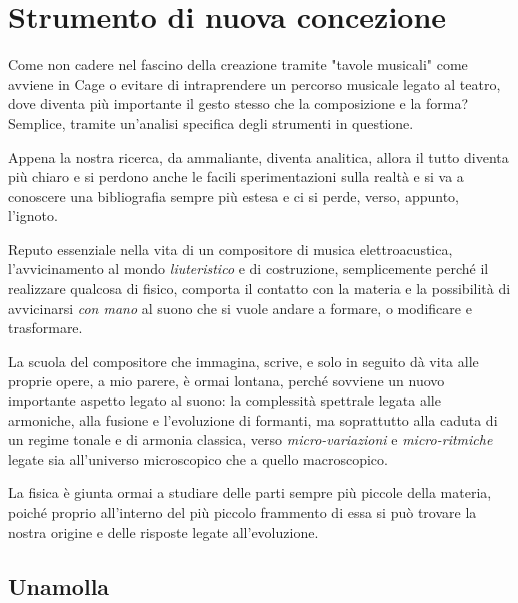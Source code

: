 
\chapter{Strumento di nuova concezione}
\label{Strumento di nuova concezione}

Come non cadere nel fascino della creazione tramite "tavole musicali" come avviene
in Cage o evitare di intraprendere un percorso musicale legato al teatro, dove
diventa più importante il gesto stesso che la composizione e la forma? Semplice,
tramite un'analisi specifica degli strumenti in questione.

Appena la nostra ricerca, da ammaliante, diventa analitica, allora il tutto
diventa più chiaro e si perdono anche le facili sperimentazioni sulla realtà e
si va a conoscere una bibliografia sempre più estesa e ci si perde, verso, appunto,
l'ignoto.

Reputo essenziale nella vita di un compositore di musica elettroacustica,
l'avvicinamento al mondo \textit{liuteristico} e di costruzione, semplicemente
perché il realizzare qualcosa di fisico, comporta il contatto con la materia e
la possibilità di avvicinarsi \textit{con mano} al suono che si vuole andare a
formare, o modificare e trasformare.

La scuola del compositore che immagina, scrive, e solo in seguito dà vita alle
proprie opere, a mio parere, è ormai lontana, perché sovviene un nuovo
importante aspetto legato al suono: la complessità spettrale legata alle
armoniche, alla fusione e l’evoluzione di formanti, ma soprattutto alla caduta
di un regime tonale e di armonia classica, verso \textit{micro-variazioni} e
\textit{micro-ritmiche} legate sia all’universo microscopico che a quello macroscopico.

La fisica è giunta ormai a studiare delle parti sempre più piccole della materia,
poiché proprio all’interno del più piccolo frammento di essa si può trovare la
nostra origine e delle risposte legate all’evoluzione.





\section{Unamolla}


